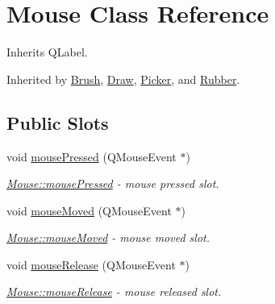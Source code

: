\hypertarget{class_mouse}{}\section{Mouse Class Reference}
\label{class_mouse}


Inherits Q\+Label.



Inherited by \mbox{\hyperlink{class_brush}{Brush}}, \mbox{\hyperlink{class_draw}{Draw}}, \mbox{\hyperlink{class_picker}{Picker}}, and \mbox{\hyperlink{class_rubber}{Rubber}}.

\subsection*{Public Slots}
\begin{DoxyCompactItemize}
\item 
void \mbox{\hyperlink{class_mouse_a75f0d490d499fd2a2593d42fcd177759}{mouse\+Pressed}} (Q\+Mouse\+Event $\ast$)
\begin{DoxyCompactList}\small\item\em \mbox{\hyperlink{class_mouse_a75f0d490d499fd2a2593d42fcd177759}{Mouse\+::mouse\+Pressed}} -\/ mouse pressed slot. \end{DoxyCompactList}\item 
void \mbox{\hyperlink{class_mouse_ad1906d0601ba2979128c918a1b4e0a6a}{mouse\+Moved}} (Q\+Mouse\+Event $\ast$)
\begin{DoxyCompactList}\small\item\em \mbox{\hyperlink{class_mouse_ad1906d0601ba2979128c918a1b4e0a6a}{Mouse\+::mouse\+Moved}} -\/ mouse moved slot. \end{DoxyCompactList}\item 
void \mbox{\hyperlink{class_mouse_a52cf37734cdd4d34f3929e0828a6f94d}{mouse\+Release}} (Q\+Mouse\+Event $\ast$)
\begin{DoxyCompactList}\small\item\em \mbox{\hyperlink{class_mouse_a52cf37734cdd4d34f3929e0828a6f94d}{Mouse\+::mouse\+Release}} -\/ mouse released slot. \end{DoxyCompactList}\end{DoxyCompactItemize}
